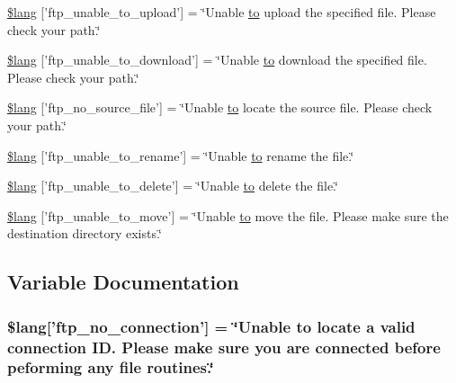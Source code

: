 \begin{DoxyCompactItemize}
\item 
\hyperlink{ftp__lang_8php_a1fd0c9f4e0f3be691a809ce804900ed7}{\$lang} \mbox{[}'ftp\-\_\-unable\-\_\-to\-\_\-upload'\mbox{]} = \char`\"{}Unable \hyperlink{mathquill_8js_ae3622f38202b3532cd6eae25726945f8}{to} upload the specified file. Please check your path.\char`\"{}
\item 
\hyperlink{ftp__lang_8php_a65fa9f8b6a3da91390b36721c2a9775b}{\$lang} \mbox{[}'ftp\-\_\-unable\-\_\-to\-\_\-download'\mbox{]} = \char`\"{}Unable \hyperlink{mathquill_8js_ae3622f38202b3532cd6eae25726945f8}{to} download the specified file. Please check your path.\char`\"{}
\item 
\hyperlink{ftp__lang_8php_abf3e74ee1af13c9b0f0cc63fbb9081f1}{\$lang} \mbox{[}'ftp\-\_\-no\-\_\-source\-\_\-file'\mbox{]} = \char`\"{}Unable \hyperlink{mathquill_8js_ae3622f38202b3532cd6eae25726945f8}{to} locate the source file. Please check your path.\char`\"{}
\item 
\hyperlink{ftp__lang_8php_ae2715b036a8015f4da2841c15ab8db79}{\$lang} \mbox{[}'ftp\-\_\-unable\-\_\-to\-\_\-rename'\mbox{]} = \char`\"{}Unable \hyperlink{mathquill_8js_ae3622f38202b3532cd6eae25726945f8}{to} rename the file.\char`\"{}
\item 
\hyperlink{ftp__lang_8php_a922b1d7a3667e2cacb0873788e548dca}{\$lang} \mbox{[}'ftp\-\_\-unable\-\_\-to\-\_\-delete'\mbox{]} = \char`\"{}Unable \hyperlink{mathquill_8js_ae3622f38202b3532cd6eae25726945f8}{to} delete the file.\char`\"{}
\item 
\hyperlink{ftp__lang_8php_a72178091982e6697b12337601213fa76}{\$lang} \mbox{[}'ftp\-\_\-unable\-\_\-to\-\_\-move'\mbox{]} = \char`\"{}Unable \hyperlink{mathquill_8js_ae3622f38202b3532cd6eae25726945f8}{to} move the file. Please make sure the destination directory exists.\char`\"{}
\end{DoxyCompactItemize}


\subsection{Variable Documentation}
\hypertarget{ftp__lang_8php_a8630404f8e0c3750f8d997f35622b6eb}{
\subsubsection[{\$lang}]{\setlength{\rightskip}{0pt plus 5cm}\$lang\mbox{[}'ftp\-\_\-no\-\_\-connection'\mbox{]} = \char`\"{}Unable {\bf to} locate {\bf a} valid connection I\-D. Please make sure you are connected before peforming any file routines.\char`\"{}}}\label{ftp__lang_8php_a8630404f8e0c3750f8d997f35622b6eb}


